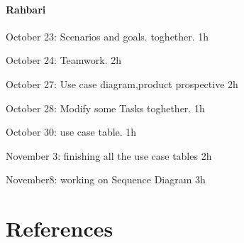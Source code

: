 \documentclass{article}
\begin{document}
	\paragraph{Rahbari}
		\begin{list}{-}{}
			\item October 23: Scenarios and goals. toghether. 1h
			\item October 24: Teamwork. 2h
			\item October 27: Use case diagram,product prospective 2h
			\item October 28: Modify some Tasks toghether. 1h
			\item October 30: use case table. 1h
			\item November 3: finishing all the use case tables 2h
			\item November8: working on Sequence Diagram 3h
		\end{list}
\section{References}
\end{document}
